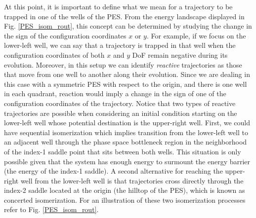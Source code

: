 \documentclass[10pt,aps,onecolumn,superscriptaddress]{revtex4-2}
\begin{document}
At this point, it is important to define what we mean for a trajectory to be trapped in one of the wells of the PES. From the energy landscape displayed in Fig. \ref{PES_isom_rout}, this concept can be determined by studying the change in the sign of the configuration coordinates $x$ or $y$. For example, if we focus on the lower-left well, we can say that a trajectory is trapped in that well when the configuration coordinates of both $x$ and $y$ DoF remain negative during its evolution. Moreover, in this setup we can identify \textit{reactive} trajectories as those that move from one well to another along their evolution. Since we are dealing in this case with a symmetric PES with respect to the origin, and there is one well in each quadrant, reaction would imply a change in the sign of one of the configuration coordinates of the trajectory. Notice that two types of reactive trajectories are possible when considering an initial condition starting on the lower-left well whose potential destination is the upper-right well. First, we could have sequential isomerization which implies transition from the lower-left well to an adjacent well through the phase space bottleneck region in the neighborhood of the index-1 saddle point that sits between both wells. This situation is only possible given that the system has enough energy to surmount the energy barrier (the energy of the index-1 saddle). A second alternative for reaching the upper-right well from the lower-left well is that trajectories cross directly through the index-2 saddle located at the origin (the hilltop of the PES), which is known as concerted isomerization. For an illustration of these two isomerization processes refer to Fig. \ref{PES_isom_rout}.
\end{document}
